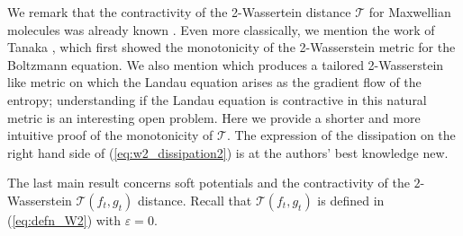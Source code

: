 \documentclass[11pt]{amsart}
\numberwithin{equation}{section}
\begin{document}

We remark that the contractivity of the 2-Wassertein distance $\mathcal T$ for Maxwellian molecules was already known \cite{Fournier_Guillin,Carrapatoso}. Even more classically, we mention the work of Tanaka \cite{Tanaka}, which first showed the monotonicity of the 2-Wasserstein metric for the Boltzmann equation. We also mention \cite{CarrilloDelgadinoDesvillettesWu2024} which produces a tailored 2-Wasserstein like metric on which the Landau equation arises as the gradient flow of the entropy;  understanding if the Landau equation is contractive in this natural metric is an interesting open problem. Here we provide a shorter and more intuitive proof of the monotonicity of $\mathcal T$. The expression of the dissipation on the right hand side of (\ref{eq:w2_dissipation2}) is at the authors' best  knowledge new. 







The last main result concerns soft potentials and the contractivity of the $2$-Wasserstein  $ \mathcal T(f_{t},g_{t})$ distance. Recall that $ \mathcal T(f_{t},g_{t})$ is defined in (\ref{eq:defn_W2}) with $\varepsilon =0$. 
\end{document}
